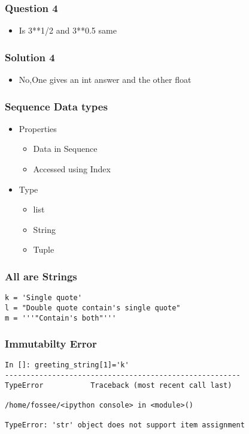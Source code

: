 \documentclass[presentation]{beamer}
\begin{document}
\begin{frame}
\frametitle{Question 4}
\label{sec-10}

\begin{itemize}
\item Is 3**1/2 and 3**0.5 same
\end{itemize}
\end{frame}
\begin{frame}
\frametitle{Solution 4}
\label{sec-11}

\begin{itemize}
\item No,One gives an int answer and the other float
\end{itemize}
\end{frame}
\begin{frame}
\frametitle{Sequence Data types}
\label{sec-12}
\begin{itemize}

\item Properties
\label{sec-12_1}%
\begin{itemize}
\item Data in Sequence
\item Accessed using Index
\end{itemize}


\item Type
\label{sec-12_2}%
\begin{itemize}
\item list
\item String
\item Tuple
\end{itemize}


\end{itemize} %
\end{frame}
\begin{frame}[fragile]
\frametitle{All are Strings}
\label{sec-13}

\lstset{language=Python}
\begin{lstlisting}
k = 'Single quote'
l = "Double quote contain's single quote"
m = '''"Contain's both"'''
\end{lstlisting}
\end{frame}
\begin{frame}[fragile]
\frametitle{Immutabilty Error}
\label{sec-14}

\lstset{language=Python}
\begin{lstlisting}
In []: greeting_string[1]='k'
-------------------------------------------------------
TypeError           Traceback (most recent call last)

/home/fossee/<ipython console> in <module>()

TypeError: 'str' object does not support item assignment
\end{lstlisting}
\end{frame}
\end{document}
